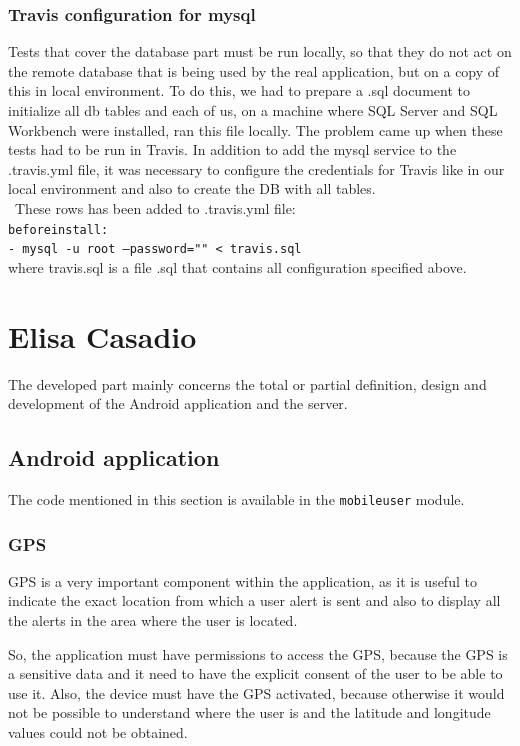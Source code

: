 \documentclass[a4paper,12pt]{report}
\begin{document}
\subsubsection{Travis configuration for mysql}
Tests that cover the database part must be run locally, so that they do not act on the remote database that is being used by the real application, but on a copy of this in local environment.
To do this, we had to prepare a .sql document to initialize all db tables and each of us, on a machine where SQL Server and SQL Workbench were installed, ran this file locally.
The problem came up when these tests had to be run in Travis. In addition to add the mysql service to the .travis.yml file, it was necessary to configure the credentials for Travis like in our local environment and also to create the DB with all tables. \\\
These rows has been added to .travis.yml file:\\
\texttt{before}\textunderscore\texttt{install:}\\
\texttt{- mysql -u root --password="" < travis.sql}
\\where travis.sql is a file .sql that contains all configuration specified above.

\section{Elisa Casadio}
The developed part mainly concerns the total or partial definition, design and development of the Android application and the server.

\subsection{Android application}
The code mentioned in this section is available in the \texttt{mobileuser} module.
\subsubsection{GPS}
GPS is a very important component within the application, as it is useful to indicate the exact location from which a user alert is sent and also to display all the alerts in the area where the user is located.

So, the application must have permissions to access the GPS, because the GPS is a sensitive data and it need to have the explicit consent of the user to be able to use it. Also, the device must have the GPS activated, because otherwise it would not be possible to understand where the user is and the latitude and longitude values could not be obtained.
\end{document}
